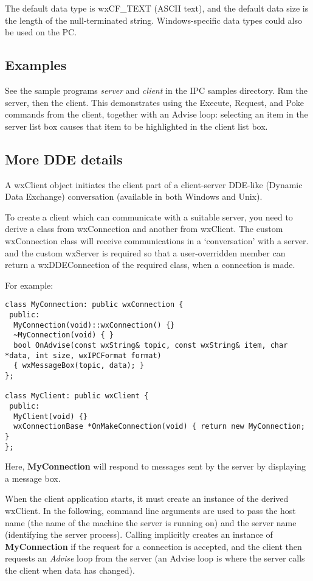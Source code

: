 The default data type is wxCF\_TEXT (ASCII text), and the default data
size is the length of the null-terminated string. Windows-specific data
types could also be used on the PC.

\subsection{Examples}

See the sample programs {\it server}\/ and {\it client}\/ in the IPC
samples directory.  Run the server, then the client. This demonstrates
using the Execute, Request, and Poke commands from the client, together
with an Advise loop: selecting an item in the server list box causes
that item to be highlighted in the client list box.

\subsection{More DDE details}

A wxClient object initiates the client part of a client-server
DDE-like (Dynamic Data Exchange) conversation (available in both
Windows and Unix).

To create a client which can communicate with a suitable server,
you need to derive a class from wxConnection and another from
wxClient. The custom wxConnection class will receive
communications in a `conversation' with a server.  and the custom
wxServer is required so that a user-overridden
member can return a wxDDEConnection of the required class, when a
connection is made.

For example:

\begin{verbatim}
class MyConnection: public wxConnection {
 public:
  MyConnection(void)::wxConnection() {}
  ~MyConnection(void) { }
  bool OnAdvise(const wxString& topic, const wxString& item, char *data, int size, wxIPCFormat format)
  { wxMessageBox(topic, data); }
};

class MyClient: public wxClient {
 public:
  MyClient(void) {}
  wxConnectionBase *OnMakeConnection(void) { return new MyConnection; }
};

\end{verbatim}

Here, {\bf MyConnection} will respond to
 messages sent by the
server by displaying a message box.

When the client application starts, it must create an instance of
the derived wxClient. In the following, command line arguments
are used to pass the host name (the name of the machine the
server is running on) and the server name (identifying the server
process). Calling
\rtfsp
implicitly creates an instance of {\bf MyConnection} if the
request for a connection is accepted, and the client then
requests an {\it Advise} loop from the server (an Advise loop is
where the server calls the client when data has changed).


